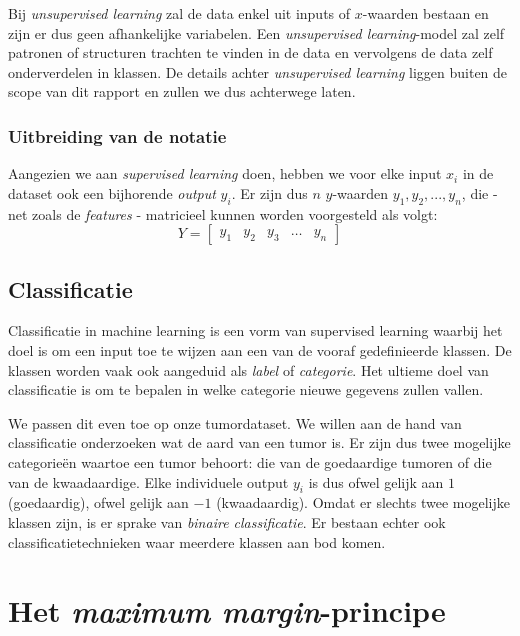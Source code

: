 \documentclass[twoside, kulak]{kulakreport}
\begin{document}
	Bij \textit{unsupervised learning} zal de data enkel uit inputs of \(x\)-waarden bestaan en zijn er dus geen afhankelijke variabelen. Een \textit{unsupervised learning}-model zal zelf patronen of structuren trachten te vinden in de data en vervolgens de data zelf onderverdelen in klassen. De details achter \emph{unsupervised learning} liggen buiten de scope van dit rapport en zullen we dus achterwege laten.
	
	\subsection{Uitbreiding van de notatie}

	Aangezien we aan \textit{supervised learning} doen, hebben we voor elke input \(x_i\) in de dataset ook een bijhorende \textit{output} \(y_i\). Er zijn dus \(n\) \(y\)-waarden \(y_1,y_2,...,y_n\), die - net zoals de \textit{features} - matricieel kunnen worden voorgesteld als volgt: \[Y =  \left[ \begin{array}{ccccc} y_1 & y_2 & y_3 & \ldots & y_n \end{array} \right]\]
	
	\section{Classificatie}
	
	Classificatie in machine learning is een vorm van supervised learning waarbij het doel is om een input toe te wijzen aan een van de vooraf gedefinieerde klassen. De klassen worden vaak ook aangeduid als \textit{label} of \textit{categorie}. Het ultieme doel van classificatie is om te bepalen in welke categorie nieuwe gegevens zullen vallen.
	
	We passen dit even toe op onze tumordataset. We willen aan de hand van classificatie onderzoeken wat de aard van een tumor is. Er zijn dus twee mogelijke categorieën waartoe een tumor behoort: die van de goedaardige tumoren of die van de kwaadaardige. Elke individuele output \(y_i\) is dus ofwel gelijk aan \(1\) (goedaardig), ofwel gelijk aan \(-1\) (kwaadaardig). Omdat er slechts twee mogelijke klassen zijn, is er sprake van \textit{binaire classificatie}. Er bestaan echter ook classificatietechnieken waar meerdere klassen aan bod komen.
	
	\chapter{Het \textit{maximum margin}-principe}
	
\end{document}
